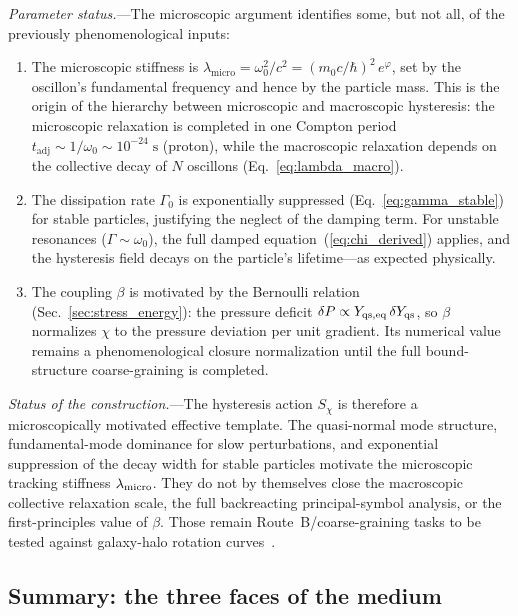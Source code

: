 \documentclass[aps,prd,onecolumn,superscriptaddress,nofootinbib,showpacs,12pt,notitlepage]{revtex4-2}
\begin{document}
\textit{Parameter status.}---The microscopic argument identifies
some, but not all, of the previously phenomenological inputs:
\begin{enumerate}
\item[(i)] The microscopic stiffness is
  $\lambda_{\mathrm{micro}} = \omega_0^2/c^2
  = (m_0 c/\hbar)^2\,e^{\varphi}$, set by the oscillon's
  fundamental frequency and hence by the particle mass.
  This is the origin of the hierarchy between microscopic
  and macroscopic hysteresis: the microscopic relaxation
  is completed in one Compton period
  $t_{\mathrm{adj}} \sim 1/\omega_0
  \sim 10^{-24}\;\mathrm{s}$ (proton), while the
  macroscopic relaxation depends on the collective decay
  of $N$ oscillons (Eq.~\ref{eq:lambda_macro}).
\item[(ii)] The dissipation rate $\Gamma_0$ is
  exponentially suppressed
  (Eq.~\ref{eq:gamma_stable}) for stable particles,
  justifying the neglect of the damping term.  For
  unstable resonances ($\Gamma \sim \omega_0$), the full
  damped equation~(\ref{eq:chi_derived}) applies, and
  the hysteresis field decays on the particle's
  lifetime---as expected physically.
\item[(iii)] The coupling $\beta$ is motivated by the
  Bernoulli relation
  (Sec.~\ref{sec:stress_energy}): the pressure deficit
  $\delta P \propto Y_{{\rm qs},\mathrm{eq}}\,\delta Y_{\rm qs}$,
  so $\beta$ normalizes $\chi$ to the pressure deviation
  per unit gradient.  Its numerical value remains a
  phenomenological closure normalization until the full
  bound-structure coarse-graining is completed.
\end{enumerate}

\textit{Status of the construction.}---The hysteresis
action $S_\chi$ is therefore a microscopically motivated effective
template.  The quasi-normal mode structure, fundamental-mode dominance
for slow perturbations, and exponential suppression of the decay width
for stable particles motivate the microscopic tracking stiffness
$\lambda_{\rm micro}$.  They do not by themselves close the
macroscopic collective relaxation scale, the full backreacting
principal-symbol analysis, or the first-principles value of $\beta$.
Those remain Route~B/coarse-graining tasks to be tested against
galaxy-halo rotation curves~\cite{Lotishvili2026}.

\subsection{Summary: the three faces of the medium}
\label{sec:three_faces}
\end{document}
